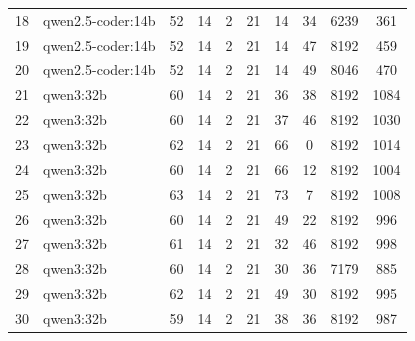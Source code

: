 \begin{table}[htbp]
{\begin{tabular}{|c|l|c|c|c|c|c|c|c|c|}
18 & qwen2.5-coder:14b    & 52 & 14 & 2 & 21 & 14 & 34 &  6239 & 361 \\
19 & qwen2.5-coder:14b    & 52 & 14 & 2 & 21 & 14 & 47 &  8192 & 459 \\
20 & qwen2.5-coder:14b    & 52 & 14 & 2 & 21 & 14 & 49 &  8046 & 470 \\
\hline
21 & qwen3:32b            & 60 & 14 & 2 & 21 & 36 & 38 &  8192 & 1084 \\
22 & qwen3:32b            & 60 & 14 & 2 & 21 & 37 & 46 &  8192 & 1030 \\
23 & qwen3:32b            & 62 & 14 & 2 & 21 & 66 &  0 &  8192 & 1014 \\
24 & qwen3:32b            & 60 & 14 & 2 & 21 & 66 & 12 &  8192 & 1004 \\
25 & qwen3:32b            & 63 & 14 & 2 & 21 & 73 &  7 &  8192 & 1008 \\
26 & qwen3:32b            & 60 & 14 & 2 & 21 & 49 & 22 &  8192 &  996 \\
27 & qwen3:32b            & 61 & 14 & 2 & 21 & 32 & 46 &  8192 &  998 \\
28 & qwen3:32b            & 60 & 14 & 2 & 21 & 30 & 36 &  7179 &  885 \\
29 & qwen3:32b            & 62 & 14 & 2 & 21 & 49 & 30 &  8192 &  995 \\
30 & qwen3:32b            & 59 & 14 & 2 & 21 & 38 & 36 &  8192 &  987 \\
\hline
\end{tabular}
}%
\label{tab:rohdaten_runs_50}
\end{table}

\clearpage

\label{app:modell_summary_50}

